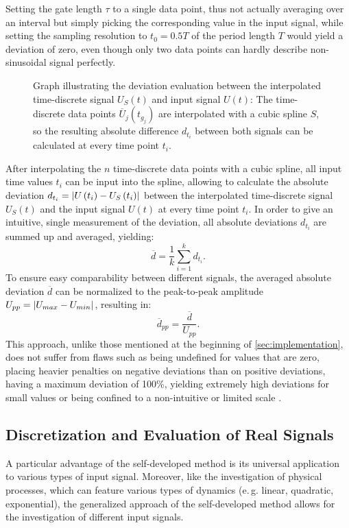 Setting the gate length $\tau$ to a single data point, thus not actually averaging over an interval but simply picking the corresponding value in the input signal, while setting the sampling resolution to $t_0 = 0.5T$ of the period length $T$ would yield a deviation of zero, even though only two data points can hardly describe non-sinusoidal signal perfectly.%
\begin{figure}[H]
	\centering
	\caption{Graph illustrating the deviation evaluation between the interpolated time-discrete signal $U_S\left(t\right)$ and input signal $U\left(t\right)$: The time-discrete data points $\overline{U}_j\left(t_{g_j}\right)$ are interpolated with a cubic spline $S$, so the resulting absolute difference $d_{t_i}$ between both signals can be calculated at every time point $t_i$.}
	\label{fig:evaluation-method}
\end{figure}
After interpolating the $n$ time-discrete data points with a cubic spline, all input time values $t_i$ can be input into the spline, allowing to calculate the absolute deviation $d_{t_i} = \abs{U\left(t_i\right) - U_S\left(t_i\right)}$ between the interpolated time-discrete signal $U_S\left(t\right)$ and the input signal $U\left(t\right)$ at every time point $t_i$. In order to give an intuitive, single measurement of the deviation, all absolute deviations $d_{t_i}$ are summed up and averaged, yielding: $$\overline{d} = \frac{1}{k}\sum^k_{i=1}d_{t_i}.$$ 
To ensure easy comparability between different signals, the averaged absolute deviation $\overline{d}$ can be normalized to the peak-to-peak amplitude $U_{pp} = \abs{U_{max}-U_{min}}$, resulting in: $$\overline{d}_{pp} = \frac{\overline{d}}{U_{pp}}.$$ 
This approach, unlike those mentioned at the beginning of \cref{sec:implementation}, does not suffer from flaws such as being undefined for values that are zero, placing heavier penalties on negative deviations than on positive deviations, having a maximum deviation of 100\%, yielding extremely high deviations for small values or being confined to a non-intuitive or limited scale \cite{Bellman1959,Flores1986,Makridakis1993,Elmore2001,Hyndman2006,Kennedy2007,Kim2016}.
\subsection{Discretization and Evaluation of Real Signals} \label{ssec:real-signals}
A particular advantage of the self-developed method is its universal application to various types of input signal. Moreover, like the investigation of physical processes, which can feature various types of dynamics (e.\,g. linear, quadratic, exponential), the generalized approach of the self-developed method allows for the investigation of different input signals.

